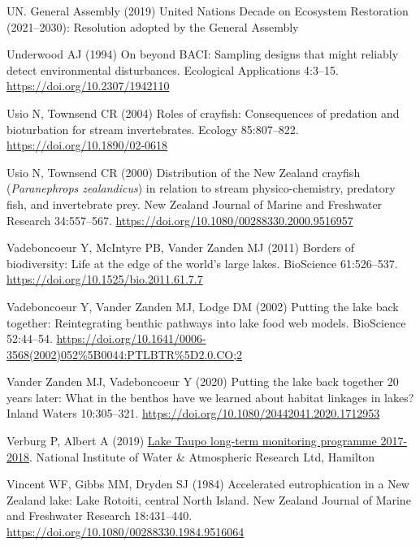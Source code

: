 \documentclass[
  12pt,
  a4paper,
  oneside]{scrbook}
\newlength{\cslhangindent}
\newenvironment{CSLReferences}[2] %
 {\begin{list}{}{%
  \setlength{\itemindent}{0pt}
  \setlength{\leftmargin}{0pt}
  \setlength{\parsep}{0pt}
  \ifodd #1
   \setlength{\leftmargin}{\cslhangindent}
   \setlength{\itemindent}{-1\cslhangindent}
  \fi
  \setlength{\itemsep}{#2\baselineskip}}}
 {\end{list}}
\begin{document}
\begin{CSLReferences}{1}{1}
UN. General Assembly (2019) {United Nations Decade} on {Ecosystem
Restoration} (2021--2030): Resolution adopted by the {General Assembly}

Underwood AJ (1994) On beyond {BACI}: Sampling designs that might
reliably detect environmental disturbances. Ecological Applications
4:3--15. \url{https://doi.org/10.2307/1942110}

Usio N, Townsend CR (2004) Roles of crayfish: Consequences of predation
and bioturbation for stream invertebrates. Ecology 85:807--822.
\url{https://doi.org/10.1890/02-0618}

Usio N, Townsend CR (2000) Distribution of the {New Zealand} crayfish
({\emph{Paranephrops zealandicus}}) in relation to stream
physico-chemistry, predatory fish, and invertebrate prey. New Zealand
Journal of Marine and Freshwater Research 34:557--567.
\url{https://doi.org/10.1080/00288330.2000.9516957}

Vadeboncoeur Y, McIntyre PB, Vander Zanden MJ (2011) Borders of
biodiversity: Life at the edge of the world's large lakes. BioScience
61:526--537. \url{https://doi.org/10.1525/bio.2011.61.7.7}

Vadeboncoeur Y, Vander Zanden MJ, Lodge DM (2002) Putting the lake back
together: Reintegrating benthic pathways into lake food web models.
BioScience 52:44--54.
\url{https://doi.org/10.1641/0006-3568(2002)052\%5B0044:PTLBTR\%5D2.0.CO;2}

Vander Zanden MJ, Vadeboncoeur Y (2020) Putting the lake back together
20 years later: What in the benthos have we learned about habitat
linkages in lakes? Inland Waters 10:305--321.
\url{https://doi.org/10.1080/20442041.2020.1712953}

Verburg P, Albert A (2019)
\href{https://www.waikatoregion.govt.nz/assets/WRC/TR201918.pdf}{{Lake
Taupo} long-term monitoring programme 2017-2018}. National Institute of
Water \& Atmospheric Research Ltd, Hamilton

Vincent WF, Gibbs MM, Dryden SJ (1984) Accelerated eutrophication in a
{New Zealand} lake: {Lake Rotoiti}, central {North Island}. New Zealand
Journal of Marine and Freshwater Research 18:431--440.
\url{https://doi.org/10.1080/00288330.1984.9516064}


\end{CSLReferences}
\end{document}
